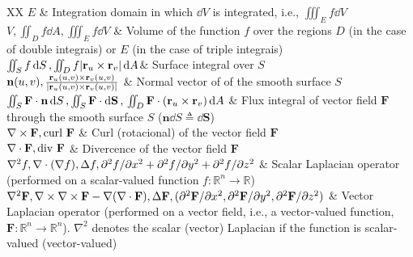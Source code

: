 \documentclass{article}
\begin{document}
\begin{xltabular}{\textwidth}{XX}
    \(E\) & Integration domain in which \(\dd{V}\) is integrated, i.e., \(\iiint_E f \dd{V}\) \cite{stewartCalculus2011} \\ \hline
    \(V, \iint_D f \dd{A}, \iiint_E f \dd{V}\) & Volume of the function \(f\) over the regions \(D\) (in the case of double integrais) or \(E\) (in the case of triple integrais) \\ \hline
    \(\iint_S f \dd{S}, \iint_D f \abs{\mathbf{r}_u\times\mathbf{r}_v} \dd{A}\)& Surface integral over \(S\) \\ \hline
    \(\mathbf{n}(u,v), \frac{\mathbf{r}_u(u,v)\times\mathbf{r}_v(u,v)}{\abs{\mathbf{r}_u(u,v)\times\mathbf{r}_v(u,v)}}\) & Normal vector of of the smooth surface \(S\) \\ \hline
    \(\iint_S \mathbf{F}\cdot \mathbf{n} \dd{S}, \iint_S \mathbf{F} \cdot \dd{\mathbf{S}}, \newline \iint_D \mathbf{F} \cdot (\mathbf{r}_u\times\mathbf{r}_v) \dd{A}\) & Flux integral of vector field \(\mathbf{F}\) through the smooth surface \(S\) (\(\mathbf{n} \dd{S} \triangleq \dd{\mathbf{S}}\)) \\ \hline
    \(\nabla \times \mathbf{F} , \textnormal{curl } \mathbf{F}\) & Curl (rotacional) of the vector field \(\mathbf{F}\)\\ \hline
    \(\nabla \cdot \mathbf{F} , \textnormal{div } \mathbf{F}\) & Divercence of the vector field \(\mathbf{F}\)\\ \hline
    \(\nabla^2 f, \nabla \cdot (\nabla f), \Delta f, \newline \partial^2f/\partial x^2 + \partial^2f/\partial y^2 + \partial^2f/\partial z^2\) & Scalar Laplacian operator (performed on a scalar-valued function \(f: \mathbb{R}^{n} \rightarrow \mathbb{R}\))\\ \hline
    \(\nabla^2 \mathbf{F}, \nabla \times \nabla \times \mathbf{F} - \nabla(\nabla \cdot \mathbf{F}), \Delta \mathbf{F}, \newline (\partial^2\mathbf{F}/\partial x^2 , \partial^2\mathbf{F}/\partial y^2 , \partial^2\mathbf{F}/\partial z^2)\) & Vector Laplacian operator (performed on a vector field, i.e., a vector-valued function, \(\mathbf{F}: \mathbb{R}^{n} \rightarrow \mathbb{R}^{n}\)). \(\nabla^2\) denotes the scalar (vector) Laplacian if the function is scalar-valued (vector-valued)\\
\end{xltabular}
\end{document}
